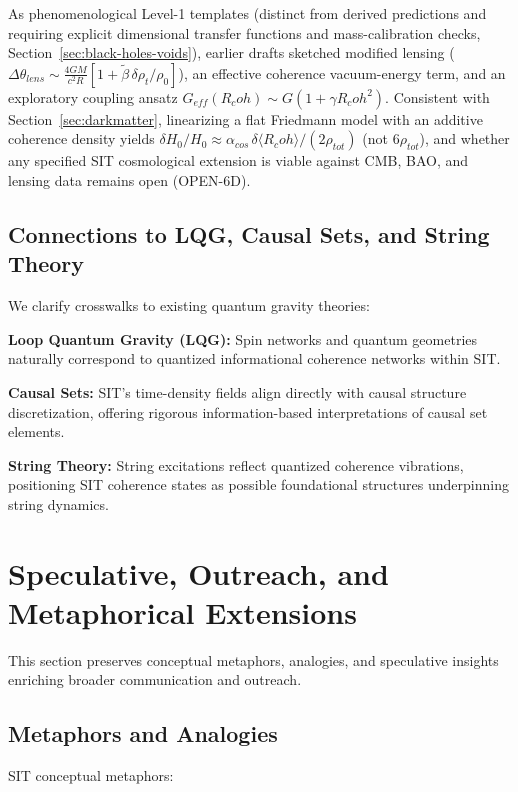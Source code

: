 \documentclass[american,11pt,letterpaper]{article}
\newcommand{\Rcoh}{R_{\mathrm{coh}}}
\def\mathrm#1{#1}%
\def\texttt#1{#1}%
\def\Rcoh{R_coh}%
\begin{document}
As phenomenological Level-1 templates (distinct from derived predictions and requiring explicit dimensional transfer functions and mass-calibration checks, Section~\ref{sec:black-holes-voids}), earlier drafts sketched modified lensing ($\Delta\theta_{\mathrm{lens}} \sim \frac{4GM}{c^2 R}[1 + \tilde{\beta}\,\delta\rho_t/\rho_0]$), an effective coherence vacuum-energy term, and an exploratory coupling ansatz $G_{\mathrm{eff}}(\Rcoh) \sim G(1 + \gamma\Rcoh^2)$. Consistent with Section~\ref{sec:darkmatter}, linearizing a flat Friedmann model with an additive coherence density yields $\delta H_0/H_0 \approx \alpha_{\mathrm{cos}}\,\delta\langle\Rcoh\rangle/(2\rho_{\mathrm{tot}})$ (not $6\rho_{\mathrm{tot}}$), and whether any specified SIT cosmological extension is viable against CMB, BAO, and lensing data remains open (\texttt{OPEN-6D}).

\subsection{Connections to LQG, Causal Sets, and String Theory}

We clarify crosswalks to existing quantum gravity theories:

\textbf{Loop Quantum Gravity (LQG):} Spin networks and quantum geometries naturally correspond to quantized informational coherence networks within SIT.

\textbf{Causal Sets:} SIT's time-density fields align directly with causal structure discretization, offering rigorous information-based interpretations of causal set elements.

\textbf{String Theory:} String excitations reflect quantized coherence vibrations, positioning SIT coherence states as possible foundational structures underpinning string dynamics.

\section{Speculative, Outreach, and Metaphorical Extensions}
\label{app:speculative}

This section preserves conceptual metaphors, analogies, and speculative insights enriching broader communication and outreach.

\subsection{Metaphors and Analogies}

SIT conceptual metaphors:
\end{document}
